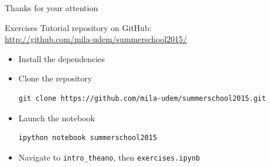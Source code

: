 \documentclass[a4paper,9pt]{beamer}
\begin{document}
\begin{frame}[fragile]{Thanks for your attention}
    \vspace{1cm}

\end{frame}

\begin{frame}[fragile]{Exercises}
  Tutorial repository on GitHub:\\
  \url{http://github.com/mila-udem/summerschool2015/}

  \begin{itemize}
    \item Install the dependencies
    \item Clone the repository
      \begin{verbatim}
git clone https://github.com/mila-udem/summerschool2015.git
      \end{verbatim}
    \item Launch the notebook
      \begin{verbatim}
ipython notebook summerschool2015
      \end{verbatim}
    \item Navigate to {\tt intro\_theano}, then {\tt exercises.ipynb}
  \end{itemize}
\end{frame}
\end{document}
